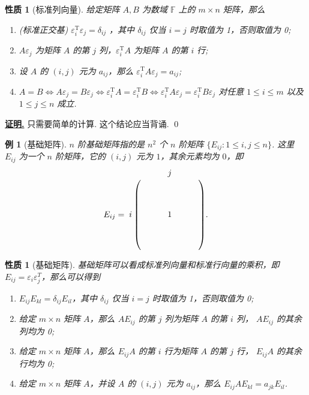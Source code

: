 \documentclass[10pt,openany]{article}
\theoremstyle{thmstyle} %
\theoremstyle{defstyle} %
\theoremstyle{prostyle} %
\newtheorem{property}[theorem]{性质}
\theoremstyle{exastyle}
\newtheorem{example}[theorem]{例}
\theoremstyle{remstyle}
\renewenvironment{proof}[1][证明]{\par\underline{\textbf{#1.}} \;\fangsong}{\qed\par}
\newcommand{\T}{^{\text{T}}}
\newcommand{\F}{\mathbb{F}}
\begin{document}
\begin{property}[标准列向量]	\label{1.3.14}
	给定矩阵 \( A,B \) 为数域 \( \F \) 上的 \( m \times n \) 矩阵，那么
	\begin{enumerate}[(1)]
		\item(标准正交基) \( \varepsilon_i\T\varepsilon_j = \delta_{ij} \) ，其中 \( \delta_{ij} \) 仅当 \( i=j \) 时取值为 1，否则取值为 0;
		\item \( A\varepsilon_j \) 为矩阵 \( A \) 的第 \( j \) 列，\( \varepsilon_i\T A \) 为矩阵 \( A \) 的第 \( i \) 行;
		\item 设 \( A \) 的 \( (i,j) \) 元为 \( a_{ij} \)，那么 \( \varepsilon_i\T A\varepsilon_j =a_{ij} \);
		\item \( A=B \Leftrightarrow A\varepsilon_j = B\varepsilon_j \Leftrightarrow \varepsilon_i\T A = \varepsilon_i\T B \Leftrightarrow \varepsilon_i\T A\varepsilon_j = \varepsilon_i\T B\varepsilon_j  \) 对任意 \( 1 \leq i \leq m \) 以及 \( 1 \leq j \leq n \) 成立.
	\end{enumerate} 

\end{property}

\begin{proof}
	只需要简单的计算. 这个结论应当背诵.
\end{proof}

\begin{example}[基础矩阵]
	\( n \) 阶基础矩阵指的是 \( n^2 \) 个 \( n \) 阶矩阵 \( \{E_{ij}:1 \leq i,j \leq n\} \). 这里 \( E_{ij} \) 为一个 \( n \) 阶矩阵，它的 \( (i,j) \) 元为 \( 1 \)，其余元素均为 \( 0 \)，即
	\[ E_{ij}=\bordermatrix{
		& & & & \textbf{\(j\)} & & &  \cr
		&  & & & &  & &  \cr
		& &  & & &  & &  \cr
		& & &  & &  & &  \cr
		\textbf{\(i\)}	& & & & 1 & & &   \cr
		& &  & & &   & &  \cr
		& & & &  & & &  \cr
		& & & & & & &   
	}. \]
\end{example}

\begin{property}[基础矩阵]	\label{1.3.16}
	基础矩阵可以看成标准列向量和标准行向量的乘积，即 \( E_{ij}=\varepsilon_i\varepsilon_j^{T} \)，那么可以得到
	\begin{enumerate}[(1)]
		\item \( E_{ij}E_{kl}=\delta_{ij}E_{il} \)，其中 \( \delta_{ij} \) 仅当 \( i=j \) 时取值为 1，否则取值为 0;
		\item 给定 \( m \times n \) 矩阵 \( A \)，那么 \( AE_{ij} \) 的第 \( j \) 列为矩阵 \( A \) 的第 \( i \) 列， \( AE_{ij} \) 的其余列均为 0;
		\item 给定 \( m \times n \) 矩阵 \( A \)，那么 \( E_{ij}A \) 的第 \( i \) 行为矩阵 \( A \) 的第 \( j \) 行， \( E_{ij}A \) 的其余行均为 0;
		\item 给定 \( m \times n \) 矩阵 \( A \)，并设 \( A \) 的 \( (i,j) \) 元为 \( a_{ij} \)，那么 \( E_{ij}AE_{kl} =a_{jk}E_{il} \).
	\end{enumerate}

\end{property}
\end{document}
